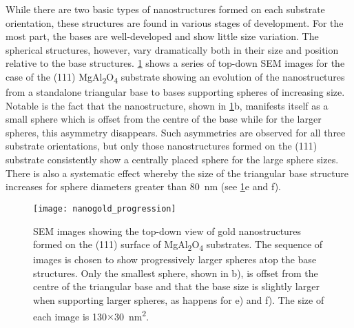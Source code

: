 While there are two basic types of nanostructures formed on each substrate orientation, these structures are found in various stages of development.
For the most part, the bases are well-developed and show little size variation.
The spherical structures, however, vary dramatically both in their size and position relative to the base structures.
\cref{fig:nanogold_progression} shows a series of top-down SEM images for the case of the (111) MgAl\textsubscript{2}O\textsubscript{4} substrate showing an evolution of the nanostructures from a standalone triangular base to bases supporting spheres of increasing size.
Notable is the fact that the nanostructure, shown in \cref{fig:nanogold_progression}b, manifests itself as a small sphere which is offset from the centre of the base while for the larger spheres, this asymmetry disappears.
Such asymmetries are observed for all three substrate orientations, but only those nanostructures formed on the (111) substrate consistently show a centrally placed sphere for the large sphere sizes.
There is also a systematic effect whereby the size of the triangular base structure increases for sphere diameters greater than 80~nm (see \cref{fig:nanogold_progression}e and f).
\begin{figure}
 \centering \texttt{[image: nanogold\_progression]}
 \caption[SEM of gold nanostructure growth progression]{\label{fig:nanogold_progression}SEM images showing the top-down view of gold nanostructures formed on the (111) surface of MgAl\textsubscript{2}O\textsubscript{4} substrates.
  The sequence of images is chosen to show progressively larger spheres atop the base structures.
  Only the smallest sphere, shown in b), is offset from the centre of the triangular base and that the base size is slightly larger when supporting larger spheres, as happens for e) and f).
  The size of each image is 130\(\times\)30~nm\textsuperscript{2}.}
\end{figure}

